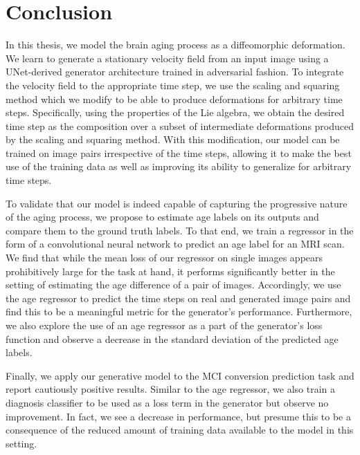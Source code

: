 \chapter{Conclusion}
In this thesis, we model the brain aging process as a diffeomorphic deformation.
We learn to generate a stationary velocity field from an input image using a UNet-derived generator architecture trained in adversarial fashion.
To integrate the velocity field to the appropriate time step, we use the scaling and squaring method which we modify to be able to produce deformations for arbitrary time steps. Specifically, using the properties of the Lie algebra, we obtain the desired time step as the composition over a subset of intermediate deformations produced by the scaling and squaring method. With this modification, our model can be trained on image pairs irrespective of the time steps, allowing it to make the best use of the training data as well as improving its ability to generalize for arbitrary time steps.

To validate that our model is indeed capable of capturing the progressive nature of the aging process, we propose to estimate age labels on its outputs and compare them to the ground truth labels.
To that end, we train a regressor in the form of a convolutional neural network to predict an age label for an MRI scan.
We find that while the mean loss of our regressor on single images appears prohibitively large for the task at hand, it performs significantly better in the setting of estimating the age difference of a pair of images.
Accordingly, we use the age regressor to predict the time steps on real and generated image pairs and find this to be a meaningful metric for the generator's performance.
Furthermore, we also explore the use of an age regressor as a part of the generator's loss function and observe a decrease in the standard deviation of the predicted age labels.

Finally, we apply our generative model to the MCI conversion prediction task and report cautiously positive results.
Similar to the age regressor, we also train a diagnosis classifier to be used as a loss term in the generator but observe no improvement. In fact, we see a decrease in performance, but presume this to be a consequence of the reduced amount of training data available to the model in this setting.
